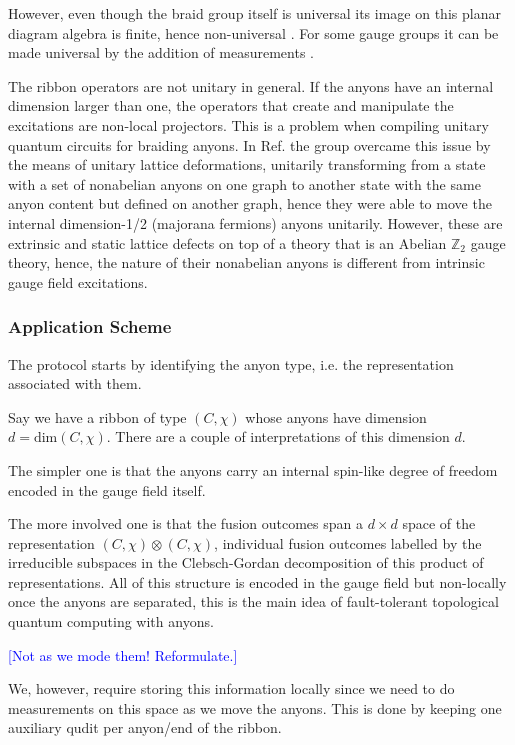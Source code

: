 \documentclass[two column]{article}
\newcommand{\jovan}[1]{\textcolor{blue}{[#1]}}
\begin{document}
However, even though the braid group itself is universal its image on this planar diagram algebra is finite, hence non-universal \cite{cui2018topological}. For some gauge groups it can be made universal by the addition of measurements \cite{Cui_2015}.

The ribbon operators are not unitary in general. If the anyons have an internal dimension larger than one, the operators that create and manipulate the excitations are non-local projectors. This is a problem when compiling unitary quantum circuits for braiding anyons. In Ref. \cite{andersen2022observation} the group overcame this issue by the means of unitary lattice deformations, unitarily transforming from a state with a set of nonabelian anyons on one graph to another state with the same anyon content but defined on another graph, hence they were able to move the internal dimension-1/2 (majorana fermions) anyons unitarily. However, these are extrinsic and static lattice defects on top of a theory that is an Abelian $\mathbb Z_2$ gauge theory, hence, the nature of their nonabelian anyons is different from intrinsic gauge field excitations.

\subsubsection{Application Scheme}

The protocol starts by identifying the anyon type, i.e. the representation associated with them. 

Say we have a ribbon of type $(C, \chi)$ whose anyons have dimension $d = \text{dim}(C, \chi)$. There are a couple of interpretations of this dimension $d$.

The simpler one is that the anyons carry an internal spin-like degree of freedom encoded in the gauge field itself. 

The more involved one is that the fusion outcomes span a $d\times d$ space of the representation $(C, \chi) \otimes (C, \chi)$, individual fusion outcomes labelled by the irreducible subspaces in the Clebsch-Gordan decomposition of this product of representations. All of this structure is encoded in the gauge field but non-locally once the anyons are separated, this is the main idea of fault-tolerant topological quantum computing with anyons.

\jovan{Not as we mode them! Reformulate.}

We, however, require storing this information locally since we need to do measurements on this space as we move the anyons. This is done by keeping one auxiliary qudit per anyon/end of the ribbon.
\end{document}

